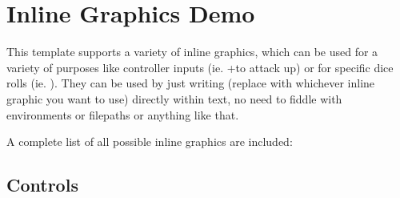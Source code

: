 \section{Inline Graphics Demo}

This template supports a variety of inline graphics, which can be used for a variety of purposes like controller inputs (ie. \controllerA+\controllerJoystickUp to attack up) or for specific dice rolls (ie. \diceSix\diceSix). They can be used by just writing \texttt{\controllerA} (replace with whichever inline graphic you want to use) directly within text, no need to fiddle with environments or filepaths or anything like that.

A complete list of all possible inline graphics are included:

\subsection{Controls}

\newcommand{\glyphdemo}[1]{#1 \hspace{1pt} \texttt{#1}}

